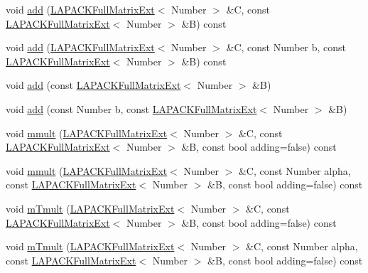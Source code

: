 \begin{DoxyCompactItemize}
\item 
void \hyperlink{classLAPACKFullMatrixExt_a824a7a919666c8af3df5723175f6201e}{add} (\hyperlink{classLAPACKFullMatrixExt}{L\+A\+P\+A\+C\+K\+Full\+Matrix\+Ext}$<$ Number $>$ \&C, const \hyperlink{classLAPACKFullMatrixExt}{L\+A\+P\+A\+C\+K\+Full\+Matrix\+Ext}$<$ Number $>$ \&B) const
\item 
void \hyperlink{classLAPACKFullMatrixExt_a793c6b5e30522c2ae653df0e80ed6ab3}{add} (\hyperlink{classLAPACKFullMatrixExt}{L\+A\+P\+A\+C\+K\+Full\+Matrix\+Ext}$<$ Number $>$ \&C, const Number b, const \hyperlink{classLAPACKFullMatrixExt}{L\+A\+P\+A\+C\+K\+Full\+Matrix\+Ext}$<$ Number $>$ \&B) const
\item 
void \hyperlink{classLAPACKFullMatrixExt_ae199890a11b5034d8ec2342c7de6c439}{add} (const \hyperlink{classLAPACKFullMatrixExt}{L\+A\+P\+A\+C\+K\+Full\+Matrix\+Ext}$<$ Number $>$ \&B)
\item 
void \hyperlink{classLAPACKFullMatrixExt_a7c46d0cb2e278577196b3d923e389efd}{add} (const Number b, const \hyperlink{classLAPACKFullMatrixExt}{L\+A\+P\+A\+C\+K\+Full\+Matrix\+Ext}$<$ Number $>$ \&B)
\item 
void \hyperlink{classLAPACKFullMatrixExt_a176ae32c5467facafd5dcc3252c07c20}{mmult} (\hyperlink{classLAPACKFullMatrixExt}{L\+A\+P\+A\+C\+K\+Full\+Matrix\+Ext}$<$ Number $>$ \&C, const \hyperlink{classLAPACKFullMatrixExt}{L\+A\+P\+A\+C\+K\+Full\+Matrix\+Ext}$<$ Number $>$ \&B, const bool adding=false) const
\item 
void \hyperlink{classLAPACKFullMatrixExt_ad38cc9eb7e424a932d9faff01cf08109}{mmult} (\hyperlink{classLAPACKFullMatrixExt}{L\+A\+P\+A\+C\+K\+Full\+Matrix\+Ext}$<$ Number $>$ \&C, const Number alpha, const \hyperlink{classLAPACKFullMatrixExt}{L\+A\+P\+A\+C\+K\+Full\+Matrix\+Ext}$<$ Number $>$ \&B, const bool adding=false) const
\item 
void \hyperlink{classLAPACKFullMatrixExt_a132200a53d62265a213059e2d93c8e82}{m\+Tmult} (\hyperlink{classLAPACKFullMatrixExt}{L\+A\+P\+A\+C\+K\+Full\+Matrix\+Ext}$<$ Number $>$ \&C, const \hyperlink{classLAPACKFullMatrixExt}{L\+A\+P\+A\+C\+K\+Full\+Matrix\+Ext}$<$ Number $>$ \&B, const bool adding=false) const
\item 
void \hyperlink{classLAPACKFullMatrixExt_a051726629042a908eafc057587a1b601}{m\+Tmult} (\hyperlink{classLAPACKFullMatrixExt}{L\+A\+P\+A\+C\+K\+Full\+Matrix\+Ext}$<$ Number $>$ \&C, const Number alpha, const \hyperlink{classLAPACKFullMatrixExt}{L\+A\+P\+A\+C\+K\+Full\+Matrix\+Ext}$<$ Number $>$ \&B, const bool adding=false) const

\end{DoxyCompactItemize}
